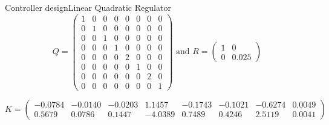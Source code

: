 \begin{frame}{Controller design}{Linear Quadratic Regulator}
\begin{equation}
	Q =
	\left(\begin{array}{cccccccc}
		1 & 0 & 0 & 0 & 0 & 0 & 0 & 0  \\
		0 & 1 & 0 & 0 & 0 & 0 & 0 & 0  \\
		0 & 0 & 1 & 0 & 0 & 0 & 0 & 0  \\
		0 & 0 & 0 & 1 & 0 & 0 & 0 & 0  \\
		0 & 0 & 0 & 0 & 2 & 0 & 0 & 0  \\
		0 & 0 & 0 & 0 & 0 & 1 & 0 & 0  \\
		0 & 0 & 0 & 0 & 0 & 0 & 2 & 0  \\
		0 & 0 & 0 & 0 & 0 & 0 & 0 & 1
	\end{array}\right)
	\text{  and  }
	R =
	\left(\begin{array}{cc}
		1 & 0  \\
		0 & 0.025
	\end{array}\right)
\end{equation}

\medskip

\begin{equation}
	K =
	\left(\begin{array}{cccccccccc}
		-0.0784 &  -0.0140 &  -0.0203 &   1.1457 &  -0.1743 &  -0.1021 &  -0.6274 &   0.0049 \\
		0.5679 &   0.0786 &   0.1447 &  -4.0389 &   0.7489 &   0.4246 &   2.5119 &   0.0041
	\end{array}\right)
\end{equation}
	
\end{frame}


